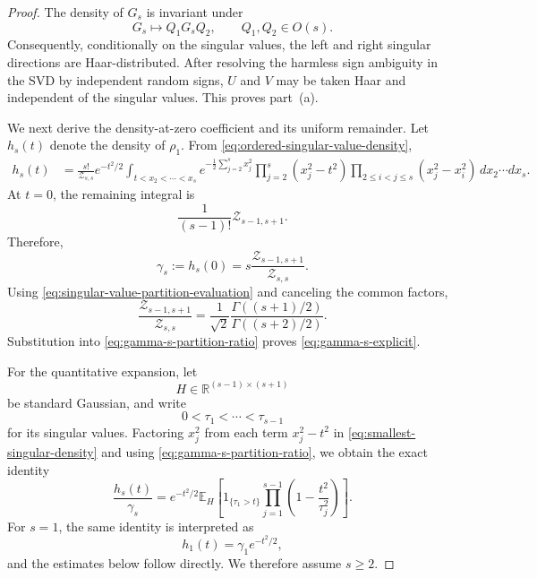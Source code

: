 \documentclass[11pt]{article}
\newcommand{\R}{\mathbb R}
\newcommand{\Ebb}{\mathbb E}
\newcommand{\1}{\mathbf 1}
\begin{document}
\begin{proof}
The density of \(G_s\) is invariant under
\[
        G_s\longmapsto Q_1G_sQ_2,
        \qquad
        Q_1,Q_2\in O(s).
\]
Consequently, conditionally on the singular values, the left and right singular directions
are Haar-distributed.  After resolving the harmless sign ambiguity in the SVD by independent
random signs, \(U\) and \(V\) may be taken Haar and independent of the singular values.  This
proves part~(a).

We next derive the density-at-zero coefficient and its uniform remainder.  Let \(h_s(t)\)
denote the density of \(\rho_1\).  From
\eqref{eq:ordered-singular-value-density},
\begin{align}
        h_s(t)
        &=
        \frac{s!}{\mathcal Z_{s,s}}
        e^{-t^2/2}
        \int_{t<x_2<\cdots<x_s}
        e^{-\frac12\sum_{j=2}^s x_j^2}
        \prod_{j=2}^s(x_j^2-t^2)
        \prod_{2\le i<j\le s}(x_j^2-x_i^2)
        \,dx_2\cdots dx_s.
        \label{eq:smallest-singular-density}
\end{align}
At \(t=0\), the remaining integral is
\[
        \frac{1}{(s-1)!}\mathcal Z_{s-1,s+1}.
\]
Therefore,
\begin{equation}
        \gamma_s
        :=
        h_s(0)
        =
        s\frac{\mathcal Z_{s-1,s+1}}{\mathcal Z_{s,s}}.
        \label{eq:gamma-s-partition-ratio}
\end{equation}
Using \eqref{eq:singular-value-partition-evaluation} and canceling the common factors,
\[
        \frac{\mathcal Z_{s-1,s+1}}{\mathcal Z_{s,s}}
        =
        \frac{1}{\sqrt2}
        \frac{\Gamma((s+1)/2)}{\Gamma((s+2)/2)}.
\]
Substitution into \eqref{eq:gamma-s-partition-ratio} proves
\eqref{eq:gamma-s-explicit}.

For the quantitative expansion, let
\[
        H\in\R^{(s-1)\times(s+1)}
\]
be standard Gaussian, and write
\[
        0<\tau_1<\cdots<\tau_{s-1}
\]
for its singular values.  Factoring \(x_j^2\) from each term \(x_j^2-t^2\) in
\eqref{eq:smallest-singular-density} and using
\eqref{eq:gamma-s-partition-ratio}, we obtain the exact identity
\begin{equation}
        \frac{h_s(t)}{\gamma_s}
        =
        e^{-t^2/2}
        \Ebb_H
        \left[
        1_{\{\tau_1>t\}}
        \prod_{j=1}^{s-1}
        \left(1-\frac{t^2}{\tau_j^2}\right)
        \right].
        \label{eq:smallest-density-rectangular-representation}
\end{equation}
For \(s=1\), the same identity is interpreted as
\[
        h_1(t)=\gamma_1e^{-t^2/2},
\]
and the estimates below follow directly.  We therefore assume \(s\ge2\).


\end{proof}
\end{document}
